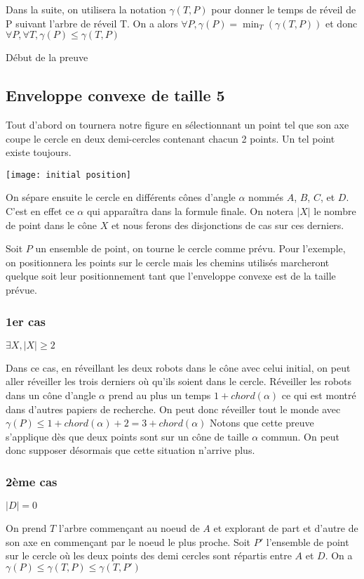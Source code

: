 Dans la suite, on utilisera la notation $\gamma(T, P)$ pour donner le temps de réveil de P suivant l'arbre de réveil T.
On a alors $\forall P, \gamma(P) = \min_T(\gamma(T,P))$
et donc $\forall P, \forall T, \gamma(P) \leq \gamma(T, P)$

Début de la preuve


\subsection{Enveloppe convexe de taille 5}

Tout d'abord on tournera notre figure en sélectionnant un point tel que son axe coupe le cercle en deux demi-cercles contenant chacun 2 points. Un tel point existe toujours.

\texttt{[image: initial position]}

On sépare ensuite le cercle en différents cônes d'angle $\alpha$ nommés $A$, $B$, $C$, et $D$. C'est en effet ce $\alpha$ qui apparaîtra dans la formule finale. On notera $|X|$ le nombre de point dans le cône $X$ et nous ferons des disjonctions de cas sur ces derniers.

Soit $P$ un ensemble de point, on tourne le cercle comme prévu. Pour l'exemple, on positionnera les points sur le cercle mais les chemins utilisés marcheront quelque soit leur positionnement tant que l'enveloppe convexe est de la taille prévue.

\subsubsection*{1er cas} $\exists X, |X| \geq 2$

Dans ce cas, en réveillant les deux robots dans le cône avec celui initial, on peut aller réveiller les trois derniers où qu'ils soient dans le cercle. Réveiller les robots dans un cône d'angle $\alpha$ prend au plus un temps $1 + chord(\alpha)$ ce qui est montré dans d'autres papiers de recherche.
On peut donc réveiller tout le monde avec $\gamma(P) \leq 1 + chord(\alpha) + 2 = 3 + chord(\alpha)$
Notons que cette preuve s'applique dès que deux points sont sur un cône de taille $\alpha$ commun. On peut donc supposer désormais que cette situation n'arrive plus.

\subsubsection*{2ème cas} $|D| = 0$

On prend $T$ l'arbre commençant au noeud de $A$ et explorant de part et d'autre de son axe en commençant par le noeud le plus proche.
Soit $P'$ l'ensemble de point sur le cercle où les deux points des demi cercles sont répartis entre $A$ et $D$.
On a $\gamma(P) \leq  \gamma(T, P) \leq \gamma(T, P')$

